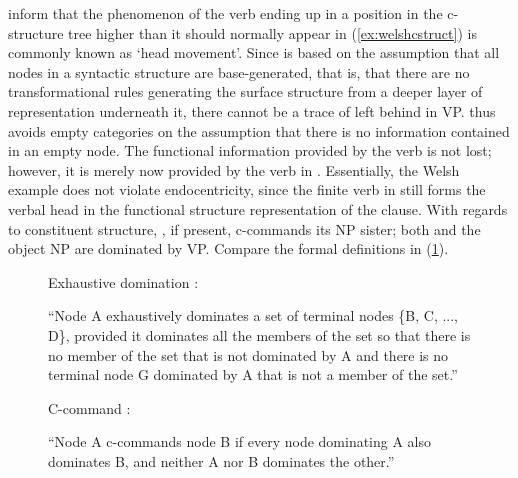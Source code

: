 \citet[129--138]{bresnan2016} inform that the phenomenon of the verb ending up
in a position in the c-structure tree higher than it should normally appear in (\ref{ex:welshcstruct}) is commonly known as
`head movement'. Since \Lfg{} is based on the assumption that all nodes in a
syntactic structure are base-generated, that is, that there are no
transformational rules generating the surface structure from a deeper layer of
representation underneath it, there cannot be a trace of  left behind
in VP. \Lfg{} thus avoids empty categories on the assumption that there is no
information contained in an empty node. The functional information provided by
the verb is not lost; however, it is merely now provided by the verb in
. Essentially, the Welsh example does not violate endocentricity,
since the finite verb in  still forms the verbal head in the
functional structure representation of the clause. With regards to constituent
structure, , if present, c-commands its NP sister; both  and
the object NP are dominated by VP.
Compare the formal definitions in (\ref{ex:domcomdef}).

\begin{figure}[h]
\pex\label{ex:domcomdef}
\a Exhaustive domination \citep[121]{carnie2013}:\smallskip

	``Node A exhaustively dominates a set of terminal nodes \{B, C, ..., D\},
	provided it dominates all the members of the set so that there is no
	member of the set that is not dominated by A and there is no terminal node
	G dominated by A that is not a member of the set.''

\a C-command \citep[127]{carnie2013}:\smallskip

	``Node A c-commands node B if every node dominating A also dominates B, and
	neither A nor B dominates the other.''
\xe
\end{figure}

